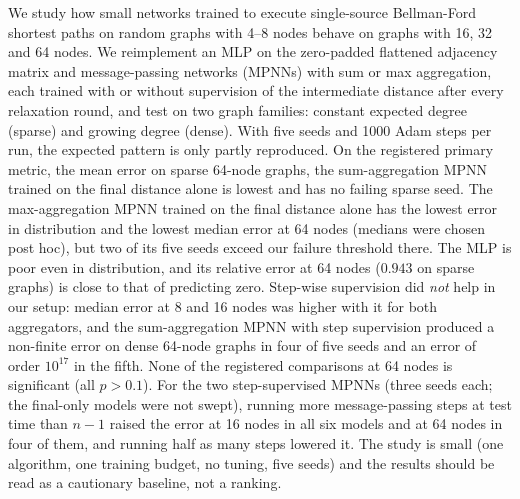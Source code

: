 We study how small networks trained to execute single-source Bellman-Ford shortest paths on random graphs with 4--8 nodes behave on graphs with 16, 32 and 64 nodes. We reimplement an MLP on the zero-padded flattened adjacency matrix and message-passing networks (MPNNs) with sum or max aggregation, each trained with or without supervision of the intermediate distance after every relaxation round, and test on two graph families: constant expected degree (sparse) and growing degree (dense). With five seeds and 1000 Adam steps per run, the expected pattern is only partly reproduced. On the registered primary metric, the mean error on sparse 64-node graphs, the sum-aggregation MPNN trained on the final distance alone is lowest and has no failing sparse seed. The max-aggregation MPNN trained on the final distance alone has the lowest error in distribution and the lowest median error at 64 nodes (medians were chosen post hoc), but two of its five seeds exceed our failure threshold there. The MLP is poor even in distribution, and its relative error at 64 nodes ($0.943$ on sparse graphs) is close to that of predicting zero. Step-wise supervision did \emph{not} help in our setup: median error at 8 and 16 nodes was higher with it for both aggregators, and the sum-aggregation MPNN with step supervision produced a non-finite error on dense 64-node graphs in four of five seeds and an error of order $10^{17}$ in the fifth. None of the registered comparisons at 64 nodes is significant (all $p>0.1$). For the two step-supervised MPNNs (three seeds each; the final-only models were not swept), running more message-passing steps at test time than $n-1$ raised the error at 16 nodes in all six models and at 64 nodes in four of them, and running half as many steps lowered it. The study is small (one algorithm, one training budget, no tuning, five seeds) and the results should be read as a cautionary baseline, not a ranking.
